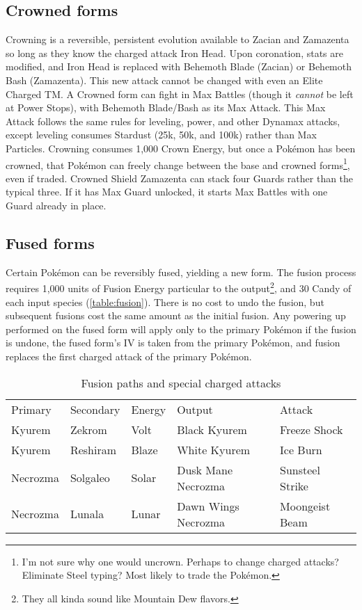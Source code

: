 \subsection{Crowned forms\label{sec:crowned}}
\nopagecolor
Crowning is a reversible, persistent evolution available to Zacian and Zamazenta
 so long as they know the charged attack Iron Head.
Upon coronation, stats are modified, and Iron Head is replaced with Behemoth Blade (Zacian)
  or Behemoth Bash (Zamazenta).
This new attack cannot be changed with even an Elite Charged TM\@.
A Crowned form can fight in Max Battles (though it \textit{cannot} be left at Power Stops), with Behemoth Blade/Bash as its Max Attack.
This Max Attack follows the same rules for leveling, power, and other Dynamax attacks,
 except leveling consumes Stardust (25k, 50k, and 100k) rather than Max Particles.
Crowning consumes 1,000 Crown Energy, but once a Pokémon has been crowned,
  that Pokémon can freely change between the base and crowned
  forms\footnote{I'm not sure why one would uncrown. Perhaps to change charged attacks?
    Eliminate Steel typing? Most likely to trade the Pokémon.}, even if traded.
Crowned Shield Zamazenta can stack four Guards rather than the typical three.
If it has Max Guard unlocked, it starts Max Battles with one Guard already in place.

\subsection{Fused forms\label{sec:fusion}}
Certain Pokémon can be reversibly fused, yielding a new form.
The fusion process requires 1,000 units of Fusion Energy particular to the output\footnote{They all kinda sound like Mountain Dew flavors.},
 and 30 Candy of each input species (\autoref{table:fusion}).
There is no cost to undo the fusion, but subsequent fusions cost the same amount as the initial fusion.
Any powering up performed on the fused form will apply only to the primary
  Pokémon if the fusion is undone, the fused form's IV is taken from the primary Pokémon,
  and fusion replaces the first charged attack of the primary Pokémon.

\begin{table}[ht]
\centering
\footnotesize
\begin{tabular}{lllll}
Primary & Secondary & Energy & Output & Attack\\
\Midrule
Kyurem & Zekrom & Volt & Black Kyurem & Freeze Shock\\
Kyurem & Reshiram & Blaze & White Kyurem & Ice Burn\\
Necrozma & Solgaleo & Solar & Dusk Mane Necrozma & Sunsteel Strike\\
Necrozma & Lunala & Lunar & Dawn Wings Necrozma & Moongeist Beam\\
\end{tabular}
\caption{Fusion paths and special charged attacks\label{table:fusion}}
\end{table}

